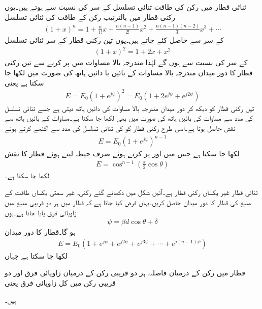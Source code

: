 ثنائی قطار میں رکن کی طاقت ثنائی تسلسل کے سر کی نسبت سے ہوتے ہیں۔یوں  رکنی قطار میں بالترتیب رکن کے طاقت  کی ثنائی تسلسل
\begin{align}
(1+x)^n =1+\frac{n}{1!}x+\frac{n(n-1)}{2!}x^2+\frac{n(n-1)(n-2)}{3!}x^3+\cdots
\end{align}
  کے سر سے حاصل کئے جاتے ہیں۔یوں تین رکنی قطار کے سر ثنائی تسلسل
\begin{align}
(1+x)^2=1+2x+x^2
\end{align} 
کے سر کی نسبت  سے  ہوں گے لہٰذا مندرجہ بالا مساوات میں  پر کرنے سے تین رکنی قطار کا دور میدان مندرجہ بالا مساوات کے بائیں یا دائیں ہاتھ کی صورت میں لکھا جا سکتا ہے یعنی 
\begin{align}
E=E_0\left(1+e^{j\psi} \right)^2 =E_0 (1+2e^{j\psi} +e^{j 2\psi})
\end{align}
تین رکنی قطار کو دیکھ کر دور میدان مندرجہ بالا مساوات کی دائیں ہاتھ دیتی ہے جسے ثنائی تسلسل کی مدد سے مساوات کی بائیں ہاتھ کی صورت میں بھی لکھا جا سکتا ہے۔مساوات کے بائیں ہاتھ سے نقش  حاصل ہوتا ہے۔اسی طرح  رکنی قطار کو  کی ثنائی تسلسل کی مدد سے اکٹھے کرتے ہوئے
\begin{align}
E=E_0 \left(1+e^{j\psi} \right)^{n-1}
\end{align}
لکھا جا سکتا ہے جس میں  اور  پر کرتے ہوئے صرف حیطہ لیتے ہوئے قطار کا نقش
\begin{align}
E=\cos^{n-1} \left(\frac{\pi}{2} \cos \theta\right)
\end{align}
لکھا جا سکتا ہے۔

ثنائی قطار غیر یکساں رکنی قطار ہے۔آئیں شکل  میں دکھائے گئے  رکنی، غیر سمتی  یکساں طاقت کے منبع کی قطار کا دور میدان حاصل کریں۔یہاں فرض کیا جاتا ہے کہ قطار میں ہر دو قریبی منبع میں  زاویائی فرق پایا جاتا ہے۔یوں
\begin{align}
\psi=\beta d \cos \theta +\delta
\end{align}
ہو گا۔قطار  کا دور میدان
\begin{align}\label{مساوات_اینٹینا_یکساں_قطار_الف}
E=E_0\left(1+e^{j \psi}+e^{j 2 \psi}+e^{j 3 \psi} +\cdots +e^{j(n-1)\psi} \right)
\end{align}
لکھا جا سکتا ہے جہاں
\begin{description}
 قطار میں رکن کے درمیان فاصلہ،
 ہر دو قریبی رکن کے درمیان زاویائی فرق اور
 دو قریبی رکن میں کل زاویائی فرق یعنی 
\end{description}
ہیں۔

